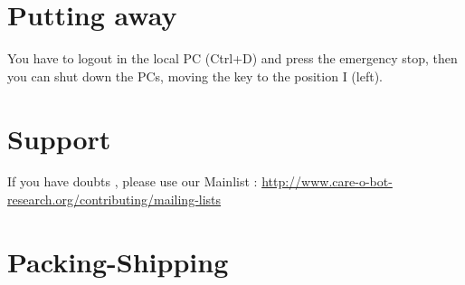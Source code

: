 \section{Putting away}
You have to logout in the local PC (Ctrl+D) and press the emergency stop, then you can shut down the PCs, moving the key to the position I (left).
\section{Support}
If you have doubts , please use our Mainlist : \url{http://www.care-o-bot-research.org/contributing/mailing-lists}
\section{Packing-Shipping} 
